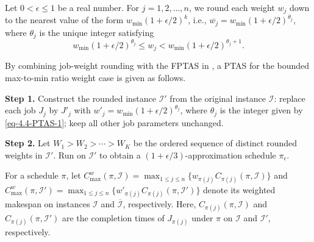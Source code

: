 \documentclass[12pt]{article} \textheight=24.5cm \textwidth=16.5cm \parskip = 0.165cm
\begin{document}
\begin{sloppypar}
        Let $0 < \epsilon \leq 1$ be a real number.
        For $j=1, 2, \ldots, n$, we round each weight $w_j$ down to the nearest value of the form  $w_{\min}(1+\epsilon/2)^k$, i.e., $\overline{w_j}=w_{\min}(1+\epsilon/2)^{\theta_j}$, where $\theta_j$ is the unique integer satisfying
        \begin{equation} \label{eq-4.4-PTAS-1}
            w_{\min}(1+\epsilon/2)^{\theta_j} \leq w_j < w_{\min}(1+\epsilon/2)^{\theta_j+1}.
        \end{equation}
        
        
        By combining job-weight rounding with the FPTAS in , a PTAS for the bounded max-to-min ratio weight case is given as follows.
        
        \begin{algorithm}[H]
            \small
            \linespread{1.2}\selectfont
            \SetAlgoLined
            \DontPrintSemicolon
            \caption{A PTAS for $F2 \mid \mid C_{\max}^w$ with bounded max-to-min weight ratio}  \label{Alg-PTAS}
            \BlankLine
            \textbf{Step 1.} Construct the rounded instance $\mathcal{I}'$ from the original instance $\mathcal{I}$: replace each job $J_j$ by $J'_j$ with $w'_j=w_{\min}(1+\epsilon/2)^{\theta_j}$, where $\theta_j$ is the integer given by \cref{eq-4.4-PTAS-1}; keep all other job parameters unchanged. \;
            
            \textbf{Step 2.} Let $W_1 >W_2> \cdots >W_K$ be the ordered sequence of distinct rounded weights in $\mathcal{I}'$. Run  on $\mathcal{I}'$ to obtain a $(1+\epsilon/3)$-approximation schedule $\pi_{\epsilon}$. \;
            
        \end{algorithm}
        
        For a schedule $\pi$, let $C_{\max}^w(\pi, \mathcal{I})=\max_{1 \leq j \leq n}\{ w_{\pi(j)} C_{\pi(j)}(\pi,\mathcal{I})\}$ and $C_{\max}^w(\pi,\mathcal{I}')=\max_{1 \leq j \leq n}\{ w'_{\pi(j)} C_{\pi(j)}(\pi, \mathcal{I}')\}$ denote its weighted makespan on instances $\mathcal{I}$ and $\overline{\mathcal{I}}$, respectively.
        Here, $C_{\pi(j)}(\pi,\mathcal{I})$ and $C_{\pi(j)}(\pi, \mathcal{I}')$ are the completion times of $J_{\pi(j)}$ under $\pi$ on $\mathcal{I}$ and $\mathcal{I}'$, respectively.
        

\end{sloppypar}
\end{document}
